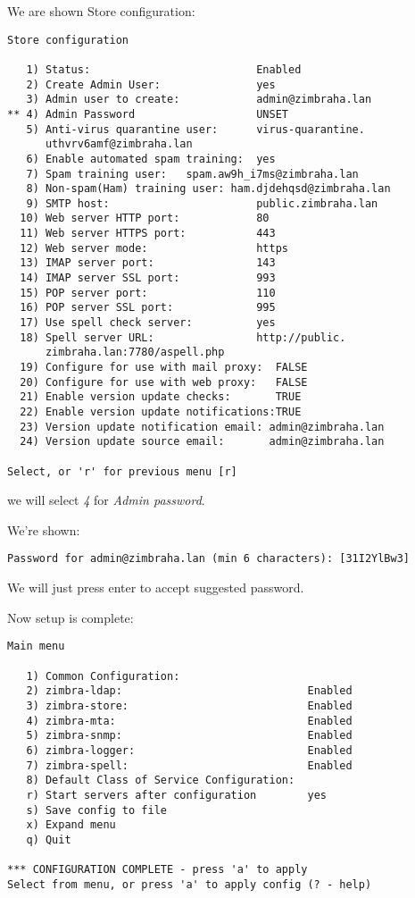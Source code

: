 We are shown Store configuration:
\begin{verbatim}
Store configuration

   1) Status:                          Enabled
   2) Create Admin User:               yes
   3) Admin user to create:            admin@zimbraha.lan
** 4) Admin Password                   UNSET
   5) Anti-virus quarantine user:      virus-quarantine.
      uthvrv6amf@zimbraha.lan
   6) Enable automated spam training:  yes 
   7) Spam training user:   spam.aw9h_i7ms@zimbraha.lan
   8) Non-spam(Ham) training user: ham.djdehqsd@zimbraha.lan
   9) SMTP host:                       public.zimbraha.lan
  10) Web server HTTP port:            80
  11) Web server HTTPS port:           443
  12) Web server mode:                 https
  13) IMAP server port:                143
  14) IMAP server SSL port:            993
  15) POP server port:                 110
  16) POP server SSL port:             995
  17) Use spell check server:          yes
  18) Spell server URL:                http://public.
      zimbraha.lan:7780/aspell.php
  19) Configure for use with mail proxy:  FALSE
  20) Configure for use with web proxy:   FALSE
  21) Enable version update checks:       TRUE
  22) Enable version update notifications:TRUE
  23) Version update notification email: admin@zimbraha.lan
  24) Version update source email:       admin@zimbraha.lan

Select, or 'r' for previous menu [r]
\end{verbatim}
we will select \textit{4} for \textit{Admin password}.

We're shown:
\begin{verbatim}
Password for admin@zimbraha.lan (min 6 characters): [31I2YlBw3]
\end{verbatim}

We will just press enter to accept suggested password.

Now setup is complete:
\begin{verbatim}
Main menu

   1) Common Configuration:                                                  
   2) zimbra-ldap:                             Enabled                       
   3) zimbra-store:                            Enabled                       
   4) zimbra-mta:                              Enabled                       
   5) zimbra-snmp:                             Enabled                       
   6) zimbra-logger:                           Enabled                       
   7) zimbra-spell:                            Enabled                       
   8) Default Class of Service Configuration:                                
   r) Start servers after configuration        yes                           
   s) Save config to file                                                    
   x) Expand menu                                                            
   q) Quit                                    

*** CONFIGURATION COMPLETE - press 'a' to apply
Select from menu, or press 'a' to apply config (? - help) 

\end{verbatim}


